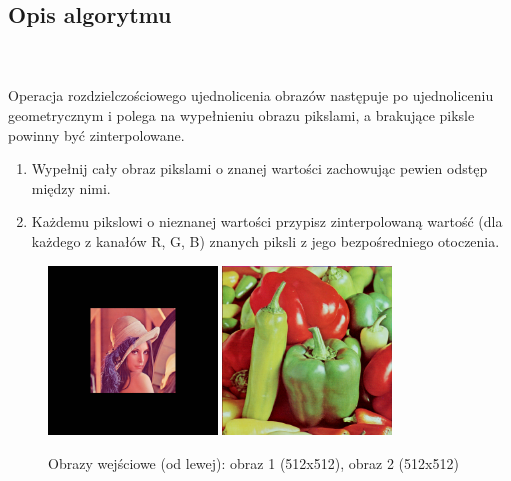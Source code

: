 \documentclass[final,a4paper,openany,12pt]{mwbk}
\begin{document}
\subsection*{Opis algorytmu}
\hfill
\\\\
\indent Operacja rozdzielczościowego ujednolicenia obrazów następuje po ujednoliceniu geometrycznym i polega na wypełnieniu obrazu pikslami, a brakujące piksle powinny być zinterpolowane.

\begin{enumerate}
	\item Wypełnij cały obraz pikslami o znanej wartości zachowując pewien odstęp między nimi.
	\item Każdemu pikslowi o nieznanej wartości przypisz zinterpolowaną wartość (dla każdego z kanałów R, G, B) znanych piksli z jego bezpośredniego otoczenia.
\end{enumerate}

\begin{figure}[H]
	\begin{center}
		\includegraphics[width=0.4\textwidth]{lena_color_unificationGeo_result}
		\includegraphics[width=0.4\textwidth]{peppers_color_unificationGeo_result}
	\end{center}
	\caption{Obrazy wejściowe (od lewej): obraz 1 (512x512), obraz 2 (512x512)}
\end{figure}
\end{document}
